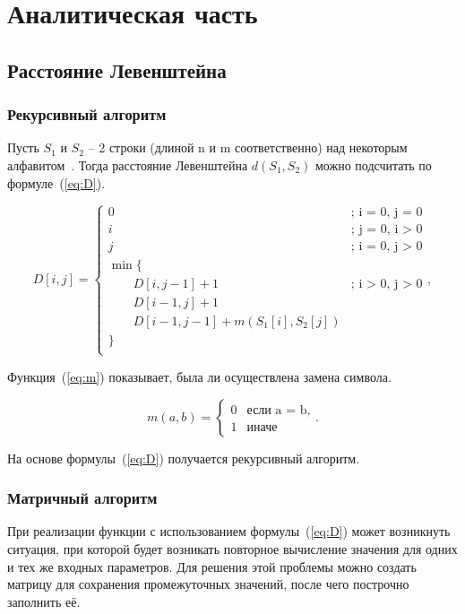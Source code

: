 \chapter{Аналитическая часть}

\section{Расстояние Левенштейна}

\subsection{Рекурсивный алгоритм}

Пусть $S_1$ и $S_2$ -- 2 строки (длиной n и m соответственно) над некоторым алфавитом~\cite{levenshtein2}. Тогда расстояние Левенштейна $d(S_1, S_2)$ можно подсчитать по формуле~(\ref{eq:D}). 

\begin{equation}
	\label{eq:D}
	D[i, j] = \begin{cases}
		0 &\text{; i = 0, j = 0}\\
		i &\text{; j = 0, i > 0}\\
		j &\text{; i = 0, j > 0}\\
		\min \lbrace \\
		\qquad D[i, j-1]+ 1 &\text{; i > 0, j > 0}\\
		\qquad D[i-1, j] + 1 \\
		\qquad D[i-1, j-1] + m(S_1[i], S_2[j]) \\
		\rbrace \\
	\end{cases},
\end{equation}

Функция~(\ref{eq:m}) показывает, была ли осуществлена замена символа.

\begin{equation}
	\label{eq:m}
	m(a, b) = \begin{cases}
		0 &\text{если a = b,}\\
		1 &\text{иначе}
	\end{cases}.
\end{equation}

На основе формулы~(\ref{eq:D}) получается рекурсивный алгоритм.

\subsection{Матричный алгоритм}

При реализации функции с использованием формулы~(\ref{eq:D}) может возникнуть ситуация, при которой будет возникать повторное вычисление значения для одних и тех же входных параметров. Для решения этой проблемы можно создать матрицу для сохранения промежуточных значений, после чего построчно заполнить её.

